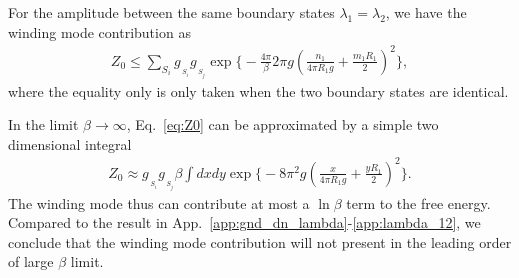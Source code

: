 For the amplitude between the same boundary states $\lambda_1=\lambda_2$, we have the winding mode contribution as
\begin{equation}
\begin{aligned}
\label{eq:Z0}
Z_0 \le  \sum_{S_i} g_{\,\!_{S_i} }g_{\,\!_{S_j} } \exp\Big\{- \frac{4\pi}{\beta} 2 \pi g ( \frac{n_1}{ 4 \pi R_1 g} + \frac{m_1 R_1 }{ 2} )^2 \Big\},
\end{aligned}
\end{equation}
where the equality only is only taken when the two boundary states are identical. 

In the limit $\beta\rightarrow\infty$, Eq.~\eqref{eq:Z0} can be approximated by a simple two dimensional integral
\begin{equation}\begin{aligned}
Z_0\approx g_{\,\!_{S_i} }g_{\,\!_{S_j} }\beta\int dxdy\exp\Big\{-8 \pi^2 g ( \frac{x}{ 4 \pi R_1 g} + \frac{y R_1 }{ 2} )^2 \Big\}.
\end{aligned}\end{equation}
The winding mode thus can contribute at most a $\ln\beta$ term to the free energy. Compared to the result in App.~\ref{app:gnd_dn_lambda}-\ref{app:lambda_12}, we conclude that the winding mode contribution will not present in the leading order of large $\beta$ limit. 


